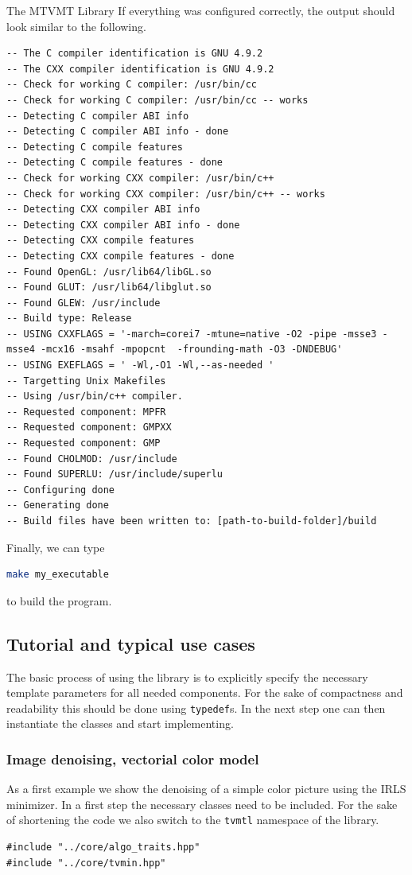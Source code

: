 \begin{chapter}{The MTVMT Library}
If everything was configured correctly, the output should look similar to the following.\\
\begin{lstlisting}
-- The C compiler identification is GNU 4.9.2
-- The CXX compiler identification is GNU 4.9.2
-- Check for working C compiler: /usr/bin/cc
-- Check for working C compiler: /usr/bin/cc -- works
-- Detecting C compiler ABI info
-- Detecting C compiler ABI info - done
-- Detecting C compile features
-- Detecting C compile features - done
-- Check for working CXX compiler: /usr/bin/c++
-- Check for working CXX compiler: /usr/bin/c++ -- works
-- Detecting CXX compiler ABI info
-- Detecting CXX compiler ABI info - done
-- Detecting CXX compile features
-- Detecting CXX compile features - done
-- Found OpenGL: /usr/lib64/libGL.so  
-- Found GLUT: /usr/lib64/libglut.so  
-- Found GLEW: /usr/include  
-- Build type: Release
-- USING CXXFLAGS = '-march=corei7 -mtune=native -O2 -pipe -msse3 -msse4 -mcx16 -msahf -mpopcnt  -frounding-math -O3 -DNDEBUG'
-- USING EXEFLAGS = ' -Wl,-O1 -Wl,--as-needed '
-- Targetting Unix Makefiles
-- Using /usr/bin/c++ compiler.
-- Requested component: MPFR
-- Requested component: GMPXX
-- Requested component: GMP
-- Found CHOLMOD: /usr/include  
-- Found SUPERLU: /usr/include/superlu  
-- Configuring done
-- Generating done
-- Build files have been written to: [path-to-build-folder]/build
\end{lstlisting}

Finally, we can type
\begin{lstlisting}[language=bash]
make my_executable
\end{lstlisting}
to build the program.


\subsection{Tutorial and typical use cases} %
\label{sub:Tutorial and typical use cases}
The basic process of using the library is to explicitly specify the necessary template parameters for all needed components. 
For the sake of compactness and readability this should be done using \texttt{typedef}s. In the next step one can then
instantiate the classes and start implementing.\\

\subsubsection{Image denoising, vectorial color model} %
\label{ssub:Image denoising, vectorial color model}
As a first example we show the denoising of a simple color picture using the IRLS minimizer. In a first step the necessary classes need to be included. For the sake of shortening the 
code we also switch to the \texttt{tvmtl} namespace of the library. \\
\cppinline
\begin{lstlisting}[label=code:tut_include,caption={Inclusion of library headers}]
#include "../core/algo_traits.hpp"
#include "../core/tvmin.hpp"


\end{lstlisting}
\end{chapter}

